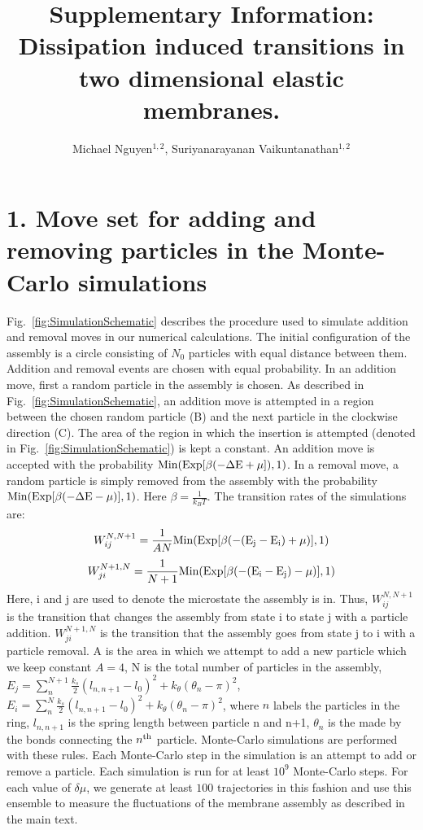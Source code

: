 \documentclass[amsmath,preprintnumbers,10pt,nofootinbib,prl,twocolumn]{revtex4-1}
\begin{document}
\title{Supplementary Information: Dissipation induced transitions in two dimensional elastic membranes.}
\author{Michael Nguyen$^{1,2}$, Suriyanarayanan Vaikuntanathan$^{1,2}$} 
\maketitle
\section{1. Move set for adding and removing particles in the Monte-Carlo simulations}
Fig.~\ref{fig:SimulationSchematic} describes the procedure used to simulate addition and removal moves in our numerical calculations. The initial configuration of the assembly is a circle consisting of $N_0$ particles with equal distance between them. Addition and removal events are chosen with equal probability. In an addition move, first a random particle in the assembly is chosen. As described in Fig.~\ref{fig:SimulationSchematic}, an addition move is attempted in a region between the chosen random particle (B) and the next particle in the clockwise direction (C). The area of the region in which the insertion is attempted (denoted in Fig.~\ref{fig:SimulationSchematic}) is kept a constant.  An addition move is  accepted with the probability $\rm{Min}(\rm{Exp}[\beta(-\Delta E +\mu]),1)$. In a removal move,  a random particle is simply removed from the assembly with the probability  $\rm{Min}(\rm{Exp}[\beta(-\Delta E -\mu)],1)$. Here $\beta=\frac{1}{k_BT}$. The transition rates of the simulations are:
\begin{equation}
W^{N,N+1}_{ij}=\frac{1}{AN}\rm{Min(Exp[\beta(-(E_j - E_i)+\mu)],1)}
\end{equation}
\begin{equation}
W^{N+1,N}_{ji}=\frac{1}{N+1}\rm{Min(Exp[\beta(-(E_i - E_j)-\mu)],1)}
\end{equation}
Here, i and j are used to denote the microstate the assembly is in. Thus, $W^{N,N+1}_{ij}$ is the transition that changes the assembly from state i to state j with a particle addition. $W^{N+1,N}_{ji}$ is the transition that the assembly goes from state j to i with a particle removal. A is the area in which we attempt to add a new particle which we keep constant $A=4$, N is the total number of particles in the assembly, $E_j=\sum_n^{N+1}{\frac{k_s}{2}(l_{n,n+1}-l_0)^2+k_\theta(\theta_n-\pi)^2}$, $E_i=\sum_n^{N}{\frac{k_s}{2}(l_{n,n+1}-l_0)^2+k_\theta(\theta_n-\pi)^2}$, where $n$ labels the particles in the ring, $l_{n,n+1}$ is the spring length between particle n and n+1, $\theta_n$ is the made by the bonds connecting the $n^{\rm th}$ particle.
Monte-Carlo simulations are performed with these rules. Each Monte-Carlo step in the simulation is an attempt to add or remove a particle. Each simulation is run for at least $10^9$ Monte-Carlo steps. For each value of $\delta \mu$, we generate at least $100$ trajectories in this fashion and use this ensemble to measure the fluctuations of the membrane assembly as described in the main text.
\end{document}
